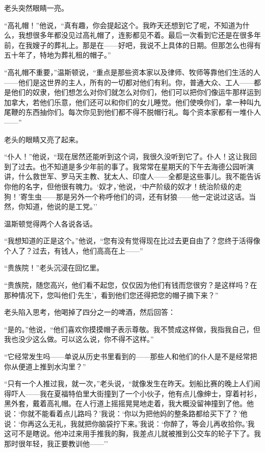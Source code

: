 老头突然眼睛一亮。

``高礼帽！''他说，``真有趣，你会提起这个。我昨天还想到它了呢，不知道为什么，我想很多年都没见过高礼帽了，连影都见不着。最后一次看到它还是在很多年前，在我嫂子的葬礼上。那是在------好吧，我说不上具体的日期。但那怎么也得有五十年了，特地为葬礼租的帽子。''

``高礼帽不重要，''温斯顿说，``重点是那些资本家以及律师、牧师等靠他们生活的人------他们是这世界的主人，所有的一切都对他们有利。你，普通大众、工人------都是他们的奴隶，他们想怎么对你们就怎么对你们，他们可以把你们像运牛那样运到加拿大，若他们乐意，他们还可以和你们的女儿睡觉。他们使唤你们，拿一种叫九尾鞭的东西抽你们。每次你见到他们都不得不脱帽行礼。每个资本家都有一堆仆人------''

老头的眼睛又亮了起来。

``仆人！''他说，``现在居然还能听到这个词，我很久没听到它了。仆人！这让我回到了过去。也不知道是多少年前的事了。我常常在星期天的下午去海德公园听演讲，什么救世军、罗马天主教、犹太人、印度人------全都是这些事儿。我不能告诉你他的名字，但他很有魄力。`奴才，'他说，`中产阶级的奴才！统治阶级的走狗！'寄生虫------那是另外一个称呼他们的词，还有豺狼------他一定说过这话。当然，你知道，他说的是工党。''

温斯顿觉得两个人各说各话。

``我想知道的正是这个。''他说，``您有没有觉得现在比过去更自由了？您终于活得像个人了？过去，有钱人，他们高高在上------''

``贵族院！''老头沉浸在回忆里。

``贵族院，随您高兴，他们看不起您，仅仅因为他们有钱而您很穷？是这样吗？在那种情况下，您叫他们`先生'，看到他们您还得把您的帽子摘下来？''

老头陷入思考，他喝掉了四分之一的啤酒，然后回答：

``是的。''他说，``他们喜欢你摸摸帽子表示尊敬。我不赞成这样做，我指我自己，但我也没少这么做。可以这么说，你不得不这样。''

``它经常发生吗------单说从历史书里看到的------那些人和他们的仆人是不是经常把你从便道上推到水沟里？''

``只有一个人推过我，就一次，''老头说，``就像发生在昨天。划船比赛的晚上人们闹得吓人------我在夏福特伯里大街撞到了一个小伙子，他有点儿像绅士，穿着衬衫，黑外套，戴着高礼帽。在人行道上摇摇晃晃地走着，我大概没留神撞到了他。他说：`你就不能看着点儿路吗？'我说：`你以为把他妈的整条路都给买下了？'他说：`你再这么无礼，我就把你脑袋拧下来。'我说：`你醉了，等会儿再收拾你。'我这可不是瞎说。他冲过来用手推我的胸，我差点儿就被推到公交车的轮子下了。我那时很年轻，我正要教训他------''

